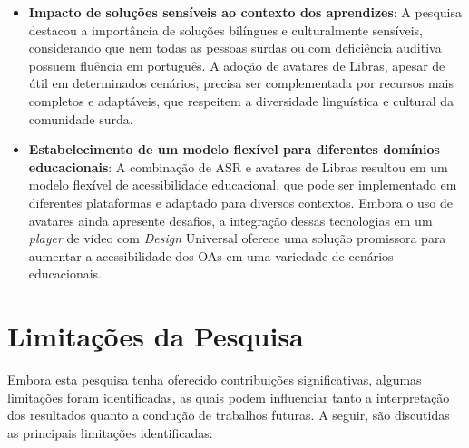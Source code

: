 \begin{itemize}
    \item \textbf{Impacto de soluções sensíveis ao contexto dos aprendizes}: A pesquisa destacou a importância de soluções bilíngues e culturalmente sensíveis, considerando que nem todas as pessoas surdas ou com deficiência auditiva possuem fluência em português. A adoção de avatares de Libras, apesar de útil em determinados cenários, precisa ser complementada por recursos mais completos e adaptáveis, que respeitem a diversidade linguística e cultural da comunidade surda.

    \item \textbf{Estabelecimento de um modelo flexível para diferentes domínios educacionais}: A combinação de ASR e avatares de Libras resultou em um modelo flexível de acessibilidade educacional, que pode ser implementado em diferentes plataformas e adaptado para diversos contextos. Embora o uso de avatares ainda apresente desafios, a integração dessas tecnologias em um \textit{player} de vídeo com \textit{Design} Universal oferece uma solução promissora para aumentar a acessibilidade dos OAs em uma variedade de cenários educacionais.
\end{itemize}

\section{Limitações da Pesquisa}

Embora esta pesquisa tenha oferecido contribuições significativas, algumas limitações foram identificadas, as quais podem influenciar tanto a interpretação dos resultados quanto a condução de trabalhos futuras. A seguir, são discutidas as principais limitações identificadas:

